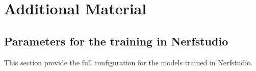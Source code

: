 \chapter{Additional Material} \label{app:additional}

\section{Parameters for the training in Nerfstudio} \label{sec:nerfstudio-train-parameters}
This section provide the full configuration for the models trained in Nerfstudio.


\begin{comment}
\begin{table}[ht]
\centering
\begin{tabular}{|l|l|}
\hline
\textbf{Description}                                             & \textbf{Default Value} \\
\hline
How far along the ray to start sampling.                & 0.05 \\
How far along the ray to stop sampling.                 & 1000.0 \\
Number of samples per ray for the nerf network.         & 48 \\
Sample every n steps after the warmup                   & 5 \\
Scales n from 1 to proposal\_update\_every over this many steps & 5000 \\
Number of proposal network iterations.                  & 2 \\
Use the same proposal network. Otherwise use different ones. & False \\
Proposal loss multiplier.                               & 1.0 \\
Distortion loss multiplier.                             & 0.002 \\
Orientation loss multipier on computed noramls.         & 0.0001 \\
Predicted normal loss multiplier.                       & 0.001 \\
Whether to use proposal weight annealing.               & True \\
Whether to use average appearance embedding or zeros for inference. & True \\
Slope of the annealing function for the proposal weights & 10.0 \\

\end{comment}
